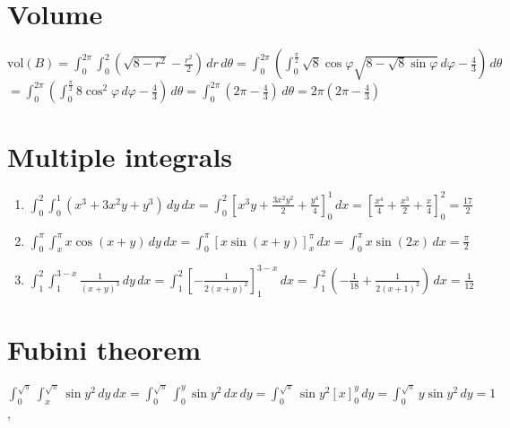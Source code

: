 \documentclass{article}
\begin{document}

\section{Volume}
$\text{vol}(B) = \int_{0}^{2\pi} \int_{0}^{2} \left(\sqrt{8 - r^2} - \frac{r^2}{2} \right) \, dr \, d\theta 
= \int_{0}^{2\pi} \left(\int_{0}^{\frac{\pi}{2}} \sqrt{8} \cos \varphi \sqrt{8 - \sqrt{8} \sin \varphi}\, d\varphi - \frac{4}{3}\right) \, d\theta$ \\
$ = \int_{0}^{2\pi} \left(\int_{0}^{\frac{\pi}{2}} 8 \cos^2 \varphi \, d\varphi - \frac{4}{3}\right) \, d\theta
= \int_{0}^{2\pi} \left(2 \pi - \frac{4}{3}\right) \, d\theta
= 2 \pi \left(2 \pi - \frac{4}{3}\right)$ 

\section{Multiple integrals}
\begin{enumerate}
    \item $\int_{0}^{2} \int_{0}^{1} (x^3 + 3x^2 y + y^3) \, dy \, dx
    = \int_{0}^{2} \left[x^3 y + \frac{3x^2 y^2}{2} + \frac{y^4}{4}\right]_0^1 \, dx
    = \left[\frac{x^4}{4} + \frac{x^3}{2} + \frac{x}{4}\right]_0^2
    = \frac{17}{2}$ 
    
    \item $\int_{0}^{\pi} \int_{x}^{\pi} x \cos(x + y) \, dy \, dx
    = \int_{0}^{\pi} \left[x \sin(x + y) \right]_x^{\pi} \, dx
    = \int_{0}^{\pi} x \sin(2x) \, dx
    = \frac{\pi}{2}$ 
    
    \item $\int_{1}^{2} \int_{1}^{3-x} \frac{1}{(x+y)^3} \, dy \, dx
    = \int_{1}^{2} \left[-\frac{1}{2(x+y)^2} \right]_1^{3-x} \, dx
    = \int_{1}^{2} \left(-\frac{1}{18} + \frac{1}{2(x+1)^2} \right) \, dx
    = \frac{1}{12}$ 
\end{enumerate}


\section{Fubini theorem}
$\int_{0}^{\sqrt{\pi}} \int_{x}^{\sqrt{\pi}} \sin y^2 \, dy \, dx
= \int_{0}^{\sqrt{\pi}} \int_{0}^{y} \sin y^2 \, dx \, dy
= \int_{0}^{\sqrt{\pi}} \sin y^2 \left[ x \right]_{0}^{y} \, dy
= \int_{0}^{\sqrt{\pi}} y \sin y^2 \, dy
= 1$, 

\vspace{10pt}
\end{document}
